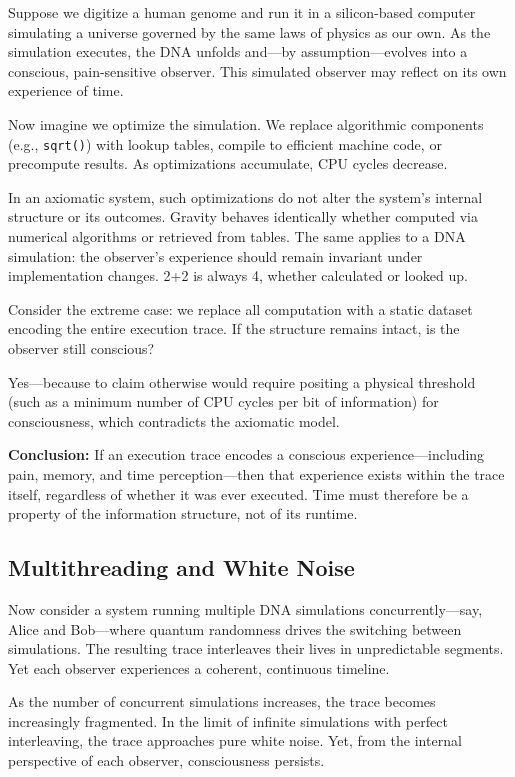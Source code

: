 \documentclass[11pt]{article}
\begin{document}
Suppose we digitize a human genome and run it in a silicon-based computer simulating a universe governed by the same laws of physics as our own. As the simulation executes, the DNA unfolds and—by assumption—evolves into a conscious, pain-sensitive observer. This simulated observer may reflect on its own experience of time.

Now imagine we optimize the simulation. We replace algorithmic components (e.g., \texttt{sqrt()}) with lookup tables, compile to efficient machine code, or precompute results. As optimizations accumulate, CPU cycles decrease.

In an axiomatic system, such optimizations do not alter the system's internal structure or its outcomes. Gravity behaves identically whether computed via numerical algorithms or retrieved from tables. The same applies to a DNA simulation: the observer’s experience should remain invariant under implementation changes. 2+2 is always 4, whether calculated or looked up.

Consider the extreme case: we replace all computation with a static dataset encoding the entire execution trace. If the structure remains intact, is the observer still conscious?

Yes—because to claim otherwise would require positing a physical threshold (such as a minimum number of CPU cycles per bit of information) for consciousness, which contradicts the axiomatic model.

\textbf{Conclusion:} If an execution trace encodes a conscious experience—including pain, memory, and time perception—then that experience exists within the trace itself, regardless of whether it was ever executed. Time must therefore be a property of the information structure, not of its runtime.

\subsection{Multithreading and White Noise}

Now consider a system running multiple DNA simulations concurrently—say, Alice and Bob—where quantum randomness drives the switching between simulations. The resulting trace interleaves their lives in unpredictable segments. Yet each observer experiences a coherent, continuous timeline.

As the number of concurrent simulations increases, the trace becomes increasingly fragmented. In the limit of infinite simulations with perfect interleaving, the trace approaches pure white noise. Yet, from the internal perspective of each observer, consciousness persists.
\end{document}
